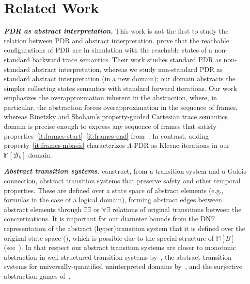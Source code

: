 \documentclass[acmsmall,screen]{acmart}
\newcommand{\para}[1]{\vspace{2pt}\noindent\textbf{\textit{#1.}}}
\newcommand{\bkwrch}[1]{\mathcal{B}_{#1}}
\newcommand{\madom}[1]{\mathbb{M}[{#1}]}
\begin{document}
\section{Related Work}
\label{sec:related}
\para{PDR as abstract interpretation}
This work is not the first to study the relation between PDR and abstract interpretation. \citet{DBLP:conf/vmcai/RinetzkyS16} prove that the reachable configurations of PDR are in simulation with the reachable states of a non-standard backward trace semantics. Their work studies standard PDR as non-standard abstract interpretation, whereas we study non-standard PDR as standard abstract interpretation (in a new domain); our domain abstracts the simpler collecting states semantics with standard forward iterations. Our work emphasizes the overapproxmation inherent in the abstraction, where, in particular, the abstraction forces overapproximation in the sequence of frames, whereas %
Rinetzky and Shoham's property-guided Cartesian trace semantics domain is precise enough to express any %
sequence of frames that satisfy properties~\ref{it:frames-start}--\ref{it:frames-end} from~. In contrast, adding property~\ref{it:frames-mbasis} characterizes $\Lambda$-PDR as Kleene iterations in our $\madom{\bkwrch{k}}$ domain.

\para{Abstract transition systems}
\citet{DBLP:journals/toplas/DamsGG97} construct, from a transition system and a Galois connection, abstract transition systems that preserve safety and other temporal properties. These are defined over a state space of abstract elements (e.g., formulas in the case of a logical domain), forming abstract edges between abstract elements through $\exists\exists$ or $\forall\exists$ relations of original transitions between the concretizations. It is important for our diameter bounds from the DNF representation of the abstract (hyper)transition system that it is defined over the original state space (), which is possible due to the special structure of $\madom{B}$ (see~).
In that respect our abstract transition systems are closer to monotonic abstraction in well-structured transition systems by~\citet{DBLP:journals/ijfcs/AbdullaDHR09}, the abstract transition systems for universally-quantified uninterpreted domains by~\citet{DBLP:conf/popl/PadonISKS16}, and the surjective abstraction games of~\citet{DBLP:conf/vmcai/FecherH07}.
\end{document}
